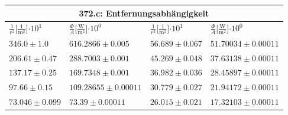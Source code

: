 \documentclass{article}
\begin{document}
\begin{tabular}{|p{3cm}|p{3cm}||p{3cm}|p{3cm}|}
\hline
\multicolumn{4}{|c|}{372.c: Entfernungsabhängigkeit}\\
\hline
$\frac{1}{r^2}$[$\frac{1}{\textrm{m}^2}$]$\cdot 10^{1}$&$\frac{\Phi}{A}$[$\frac{\textrm{W}}{\textrm{m}^2}$]$\cdot 10^{0}$&$\frac{1}{r^2}$[$\frac{1}{\textrm{m}^2}$]$\cdot 10^{1}$&$\frac{\Phi}{A}$[$\frac{\textrm{W}}{\textrm{m}^2}$]$\cdot 10^{0}$\\
\hline
$346.0\pm1.0$&$616.2866\pm 0.005$&$56.689\pm0.067$&$51.70034\pm 0.00011$\\
$206.61\pm0.47$&$288.7003\pm 0.001$&$45.269\pm0.048$&$37.63138\pm 0.00011$\\
$137.17\pm0.25$&$169.7348\pm 0.001$&$36.982\pm0.036$&$28.45897\pm 0.00011$\\
$97.66\pm0.15$&$109.28655\pm 0.00011$&$30.779\pm0.027$&$21.94172\pm 0.00011$\\
$73.046\pm0.099$&$73.39\pm 0.00011$&$26.015\pm0.021$&$17.32103\pm 0.00011$\\
\hline
\end{tabular}
\end{document}
